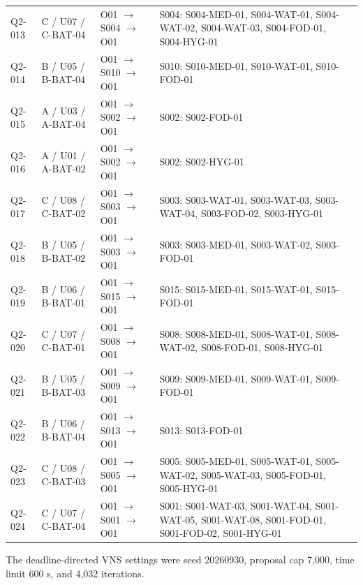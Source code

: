 \documentclass[11pt,a4paper]{article}
\begin{document}
{\begin{longtable}{@{}p{1.2cm}p{2.5cm}p{3.3cm}p{8.0cm}@{}}
Q2-013 & C / U07 / C-BAT-04 & O01 $\to$ S004 $\to$ O01 & S004: S004-MED-01, S004-WAT-01, S004-WAT-02, S004-WAT-03, S004-FOD-01, S004-HYG-01\\
Q2-014 & B / U05 / B-BAT-04 & O01 $\to$ S010 $\to$ O01 & S010: S010-MED-01, S010-WAT-01, S010-FOD-01\\
Q2-015 & A / U03 / A-BAT-04 & O01 $\to$ S002 $\to$ O01 & S002: S002-FOD-01\\
Q2-016 & A / U01 / A-BAT-02 & O01 $\to$ S002 $\to$ O01 & S002: S002-HYG-01\\
Q2-017 & C / U08 / C-BAT-02 & O01 $\to$ S003 $\to$ O01 & S003: S003-WAT-01, S003-WAT-03, S003-WAT-04, S003-FOD-02, S003-HYG-01\\
Q2-018 & B / U05 / B-BAT-02 & O01 $\to$ S003 $\to$ O01 & S003: S003-MED-01, S003-WAT-02, S003-FOD-01\\
Q2-019 & B / U06 / B-BAT-01 & O01 $\to$ S015 $\to$ O01 & S015: S015-MED-01, S015-WAT-01, S015-FOD-01\\
Q2-020 & C / U07 / C-BAT-01 & O01 $\to$ S008 $\to$ O01 & S008: S008-MED-01, S008-WAT-01, S008-WAT-02, S008-FOD-01, S008-HYG-01\\
Q2-021 & B / U05 / B-BAT-03 & O01 $\to$ S009 $\to$ O01 & S009: S009-MED-01, S009-WAT-01, S009-FOD-01\\
Q2-022 & B / U06 / B-BAT-04 & O01 $\to$ S013 $\to$ O01 & S013: S013-FOD-01\\
Q2-023 & C / U08 / C-BAT-03 & O01 $\to$ S005 $\to$ O01 & S005: S005-MED-01, S005-WAT-01, S005-WAT-02, S005-WAT-03, S005-FOD-01, S005-HYG-01\\
Q2-024 & C / U07 / C-BAT-04 & O01 $\to$ S001 $\to$ O01 & S001: S001-WAT-03, S001-WAT-04, S001-WAT-05, S001-WAT-08, S001-FOD-01, S001-FOD-02, S001-HYG-01\\
\end{longtable}
}

The deadline-directed VNS settings were seed 20260930, proposal cap 7,000, time limit 600 s, and 4,032 iterations.
\end{document}
